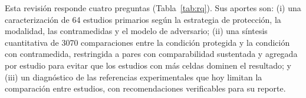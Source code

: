 \documentclass[pdflatex,sn-mathphys-num]{sn-jnl}
\theoremstyle{thmstyleone}
\theoremstyle{thmstyletwo}
\theoremstyle{thmstylethree}
\begin{document}
Esta revisión responde cuatro preguntas (Tabla~\ref{tab:rq}). Sus aportes son: (i) una caracterización de 64 estudios primarios según la estrategia de protección, la modalidad, las contramedidas y el modelo de adversario; (ii) una síntesis cuantitativa de 3070 comparaciones entre la condición protegida y la condición con contramedida, restringida a pares con comparabilidad sustentada y agregada por estudio para evitar que los estudios con más celdas dominen el resultado; y (iii) un diagnóstico de las referencias experimentales que hoy limitan la comparación entre estudios, con recomendaciones verificables para su reporte.








\FloatBarrier



\end{document}
